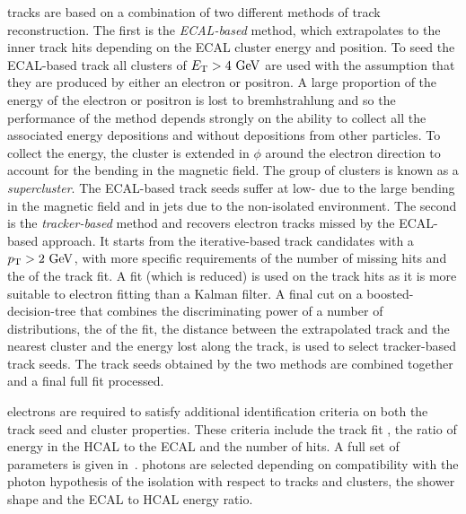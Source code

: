 \GSF{} tracks are based on a combination of two different methods of track reconstruction.
The first is the \textit{ECAL-based} method, which extrapolates to the inner track hits depending on the ECAL cluster energy and position.
To seed the ECAL-based track all clusters of $E_{\mathrm{T}}>4\mathrm{~Ge\hspace{-.08em}V}^{}$ are used with the assumption that they are produced by either an electron or positron.
A large proportion of the energy of the electron or positron is lost to bremhstrahlung and so the performance of the method depends strongly on the ability to collect all the associated energy depositions and without depositions from other particles.
To collect the energy, the cluster is extended in $\phi$ around the electron direction to account for the bending in the magnetic field.
The group of clusters is known as a \textit{supercluster}.
The ECAL-based track seeds suffer at low-\pt{} due to the large bending in the magnetic field and in jets due to the non-isolated environment.
The second is the \textit{tracker-based} method and recovers electron tracks missed by the ECAL-based approach.
It starts from the iterative-based track candidates with a $p_{\mathrm{T}}>2\mathrm{~Ge\hspace{-.08em}V}^{}$, with more specific requirements of the number of missing hits and the \chisq{} of the track fit.
A \GSF{} fit (which is reduced) is used on the track hits as it is more suitable to electron fitting than a Kalman filter.
A final cut on a boosted-decision-tree that combines the discriminating power of a number of distributions, \eg{} the \chisq{} of the \GSF{} fit, the distance between the extrapolated track and the nearest cluster and the energy lost along the \GSF{} track, is used to select tracker-based track seeds.
The track seeds obtained by the two methods are combined together and a final full \GSF{} fit processed.

\PF{} electrons are required to satisfy additional identification criteria on both the track seed and cluster properties.
These criteria include the track fit \chisq{}, the ratio of energy in the HCAL to the ECAL and the number of hits.
A full set of parameters is given in~\cite{Event:PFlow}.
\PF{} photons are selected depending on compatibility with the photon hypothesis of the isolation with respect to \GSF{} tracks and clusters, the shower shape and the ECAL to HCAL energy ratio.


